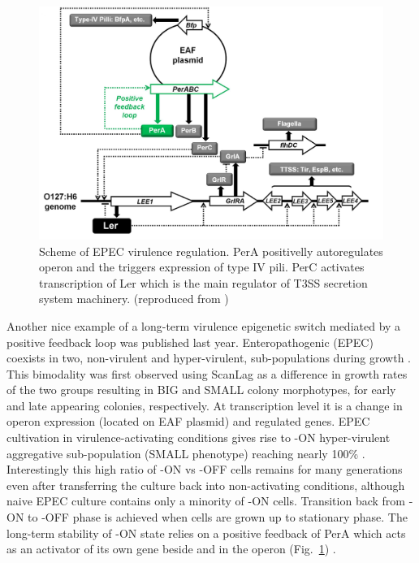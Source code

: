 \begin{figure}[h!]
  \centering
  \includegraphics[scale=0.2]{text/Pictures/perOperonRegulation.jpg}
	\caption{Scheme of EPEC virulence regulation. PerA positivelly autoregulates  operon and the triggers expression of type IV pili. PerC activates transcription of Ler which is the main regulator of T3SS secretion system machinery. (reproduced from \cite{ronin2017long})}
	\label{per}
\end{figure}

Another nice example of a long-term virulence epigenetic switch mediated by a positive feedback loop was published last year.
Enteropathogenic  (EPEC) coexists in two, non-virulent and hyper-virulent, sub-populations during growth \cite{ronin2017long}.
This bimodality was first observed  using ScanLag \cite{levin2014scanlag} as a difference in growth rates of the two groups resulting in BIG and SMALL colony morphotypes, for early and late appearing colonies, respectively.
At transcription level it is a change in  operon expression (located on EAF plasmid) and  regulated genes.
EPEC cultivation in virulence-activating conditions gives rise to -ON hyper-virulent aggregative sub-population (SMALL phenotype) reaching nearly 100\% \cite{ronin2017long}.
Interestingly this high ratio of -ON vs -OFF cells remains for many generations even after transferring the culture back into non-activating conditions, although naive EPEC culture contains only a minority of -ON cells.
Transition back from -ON to -OFF phase is achieved when cells are grown up to stationary phase.
The long-term stability of -ON state relies on a positive feedback of PerA which acts as an activator of its own gene beside  and  in the  operon (Fig.~\ref{per}) \cite{ibarra2003identification, ronin2017long}.

